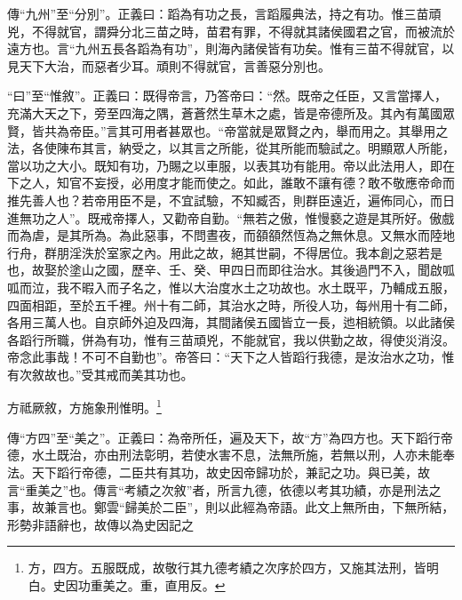 {\noindent\zhuan{}\fzbyks 傳“九州”至“分別”。正義曰：蹈為有功之長，言蹈履典法，持之有功。惟三苗頑兇，不得就官，謂舜分北三苗之時，苗君有罪，不得就其諸侯國君之官，而被流於遠方也。言“九州五長各蹈為有功”，則海內諸侯皆有功矣。惟有三苗不得就官，以見天下大治，而惡者少耳。頑則不得就官，言善惡分別也。 \par}

{\noindent\shu{}\fzkt “曰”至“惟敘”。正義曰：既得帝言，乃答帝曰：“然。既帝之任臣，又言當擇人，充滿大天之下，旁至四海之隅，蒼蒼然生草木之處，皆是帝德所及。其內有萬國眾賢，皆共為帝臣。”言其可用者甚眾也。“帝當就是眾賢之內，舉而用之。其舉用之法，各使陳布其言，納受之，以其言之所能，從其所能而驗試之。明顯眾人所能，當以功之大小。既知有功，乃賜之以車服，以表其功有能用。帝以此法用人，即在下之人，知官不妄授，必用度才能而使之。如此，誰敢不讓有德？敢不敬應帝命而推先善人也？若帝用臣不是，不宜試驗，不知臧否，則群臣遠近，遍佈同心，而日進無功之人”。既戒帝擇人，又勸帝自勤。“無若之傲，惟慢褻之遊是其所好。傲戲而為虐，是其所為。為此惡事，不問晝夜，而頟頟然恆為之無休息。又無水而陸地行舟，群朋淫泆於室家之內。用此之故，絕其世嗣，不得居位。我本創之惡若是也，故娶於塗山之國，歷辛、壬、癸、甲四日而即往治水。其後過門不入，聞啟呱呱而泣，我不暇入而子名之，惟以大治度水土之功故也。水土既平，乃輔成五服，四面相距，至於五千裡。州十有二師，其治水之時，所役人功，每州用十有二師，各用三萬人也。自京師外迫及四海，其間諸侯五國皆立一長，迆相統領。以此諸侯各蹈行所職，併為有功，惟有三苗頑兇，不能就官，我以供勤之故，得使災消沒。帝念此事哉！不可不自勤也”。帝答曰：“天下之人皆蹈行我德，是汝治水之功，惟有次敘故也。”受其戒而美其功也。 \par}

方祗厥敘，方施象刑惟明。\footnote{方，四方。五服既成，故敬行其九德考績之次序於四方，又施其法刑，皆明白。史因功重美之。重，直用反。}

{\noindent\zhuan{}\fzbyks 傳“方四”至“美之”。正義曰：為帝所任，遍及天下，故“方”為四方也。天下蹈行帝德，水土既治，亦由刑法彰明，若使水害不息，法無所施，若無以刑，人亦未能奉法。天下蹈行帝德，二臣共有其功，故史因帝歸功於，兼記之功。與已美，故言“重美之”也。傳言“考績之次敘”者，所言九德，依德以考其功績，亦是刑法之事，故兼言也。鄭雲“歸美於二臣”，則以此經為帝語。此文上無所由，下無所結，形勢非語辭也，故傳以為史因記之 \par}

